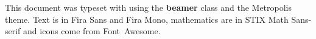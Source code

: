 \begin{frame}[plain]
  \begin{adjustwidth}{20mm}{20mm}
    \scriptsize \raggedright %
    This document was typeset with {\XeLaTeX} using the
    \textbf{beamer} class and the Metropolis theme. Text is in Fira
    Sans and Fira Mono, mathematics are in STIX Math Sans-serif and
    icons come from Font~Awesome.
  \end{adjustwidth}
\end{frame}

